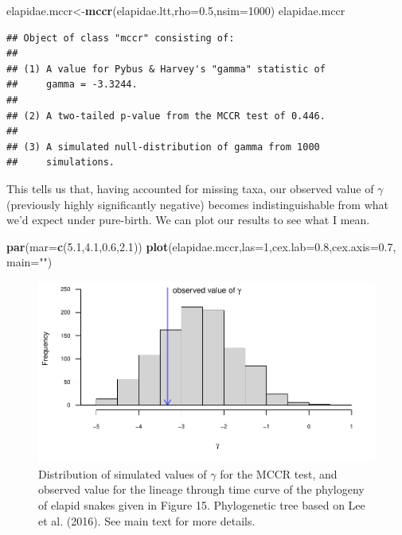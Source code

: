 \documentclass[fleqn,10pt,lineno]{wlpeerj} %
\newenvironment{Shaded}{\begin{snugshade}}{\end{snugshade}}
\newcommand{\AttributeTok}[1]{\textcolor[rgb]{0.13,0.29,0.53}{#1}}
\newcommand{\DecValTok}[1]{\textcolor[rgb]{0.00,0.00,0.81}{#1}}
\newcommand{\FloatTok}[1]{\textcolor[rgb]{0.00,0.00,0.81}{#1}}
\newcommand{\FunctionTok}[1]{\textcolor[rgb]{0.13,0.29,0.53}{\textbf{#1}}}
\newcommand{\NormalTok}[1]{#1}
\newcommand{\OtherTok}[1]{\textcolor[rgb]{0.56,0.35,0.01}{#1}}
\newcommand{\StringTok}[1]{\textcolor[rgb]{0.31,0.60,0.02}{#1}}
\begin{document}
\begin{Shaded}
\begin{Highlighting}[]
\NormalTok{elapidae.mccr}\OtherTok{\textless{}{-}}\FunctionTok{mccr}\NormalTok{(elapidae.ltt,}\AttributeTok{rho=}\FloatTok{0.5}\NormalTok{,}\AttributeTok{nsim=}\DecValTok{1000}\NormalTok{)}
\NormalTok{elapidae.mccr}
\end{Highlighting}
\end{Shaded}

\begin{verbatim}
## Object of class "mccr" consisting of:
## 
## (1) A value for Pybus & Harvey's "gamma" statistic of 
##     gamma = -3.3244.
## 
## (2) A two-tailed p-value from the MCCR test of 0.446.
## 
## (3) A simulated null-distribution of gamma from 1000
##     simulations.
\end{verbatim}

This tells us that, having accounted for missing taxa, our observed value of \(\gamma\) (previously highly significantly negative) becomes indistinguishable from what we'd expect under pure-birth. We can plot our results to see what I mean.

\begin{Shaded}
\begin{Highlighting}[]
\FunctionTok{par}\NormalTok{(}\AttributeTok{mar=}\FunctionTok{c}\NormalTok{(}\FloatTok{5.1}\NormalTok{,}\FloatTok{4.1}\NormalTok{,}\FloatTok{0.6}\NormalTok{,}\FloatTok{2.1}\NormalTok{))}
\FunctionTok{plot}\NormalTok{(elapidae.mccr,}\AttributeTok{las=}\DecValTok{1}\NormalTok{,}\AttributeTok{cex.lab=}\FloatTok{0.8}\NormalTok{,}\AttributeTok{cex.axis=}\FloatTok{0.7}\NormalTok{,}
  \AttributeTok{main=}\StringTok{""}\NormalTok{)}
\end{Highlighting}
\end{Shaded}

\begin{figure}
\includegraphics[width=1\linewidth]{Revell.phytools-v2_peerj_files/figure-latex/liol-mccr-1} \caption{Distribution of simulated values of $\gamma$ for the MCCR test, and observed value for the lineage through time curve of the phylogeny of elapid snakes given in Figure 15. Phylogenetic tree based on Lee et al. (2016). See main text for more details.}\label{fig:liol-mccr}
\end{figure}
\end{document}
